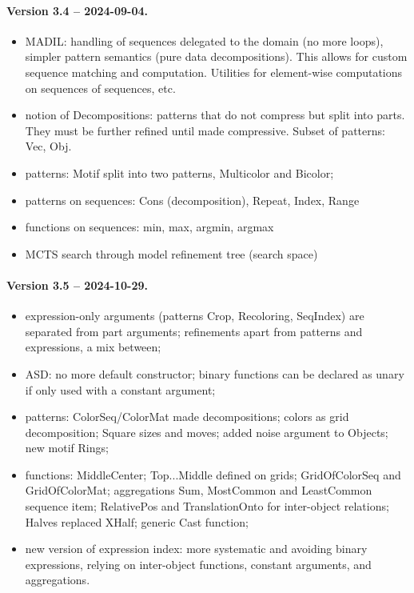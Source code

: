\documentclass[a4paper]{llncs}
\begin{document}
\paragraph{Version 3.4 -- 2024-09-04.}
\begin{itemize}
\item MADIL: handling of sequences delegated to the domain (no more loops), simpler pattern semantics (pure data decompositions). This allows for custom sequence matching and computation. Utilities for element-wise computations on sequences of sequences, etc.
\item notion of Decompositions: patterns that do not compress but split into parts. They must be further refined until made compressive. Subset of patterns: Vec, Obj.
\item patterns: Motif split into two patterns, Multicolor and Bicolor;
\item patterns on sequences: Cons (decomposition), Repeat, Index, Range
\item functions on sequences: min, max, argmin, argmax
\item MCTS search through model refinement tree (search space)
\end{itemize}

\paragraph{Version 3.5 -- 2024-10-29.}
\begin{itemize}
\item expression-only arguments (patterns Crop, Recoloring, SeqIndex) are separated from part arguments; refinements apart from patterns and expressions, a mix between;
\item ASD: no more default constructor; binary functions can be declared as unary if only used with a constant argument;
\item patterns: ColorSeq/ColorMat made decompositions; colors as grid decomposition; Square sizes and moves; added noise argument to Objects; new motif Rings;  
\item functions: MiddleCenter; Top...Middle defined on grids; GridOfColorSeq and GridOfColorMat; aggregations Sum, MostCommon and LeastCommon sequence item; RelativePos and TranslationOnto for inter-object relations; Halves replaced XHalf; generic Cast function; 
\item new version of expression index: more systematic and avoiding binary expressions, relying on inter-object functions, constant arguments, and aggregations.
\end{itemize}
\end{document}
